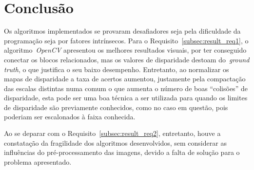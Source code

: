 \section{Conclusão}
    \label{sec:conc}
Os algoritmos implementados se provaram desafiadores seja pela dificuldade da programação seja por fatores intrínsecos. Para o Requisito~\ref{subsec:result_req1}, o algoritmo~\emph{OpenCV} apresentou os melhores resultados visuais, por ter conseguido conectar os blocos relacionados, mas os valores de disparidade destoam do~\emph{ground truth}, o que justifica o seu baixo desempenho. Entretanto, ao normalizar os mapas de disparidade a taxa de acertos aumentou, justamente pela compactação das escalas distintas numa comum o que aumenta o número de boas ``colisões'' de disparidade, esta pode ser uma boa técnica a ser utilizada para quando os limites de disparidade são previamente conhecidos, como no caso em questão, pois poderiam ser escalonados à faixa conhecida.

Ao se deparar com o Requisito~\ref{subsec:result_req2}, entretanto, houve a constatação da fragilidade dos algoritmos desenvolvidos, sem considerar as influências do pré-processamento das imagens, devido a falta de solução para o problema apresentado.
